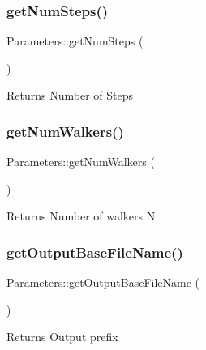 \subsubsection{\texorpdfstring{get\+Num\+Steps()}{getNumSteps()}}
{\footnotesize\ttfamily Parameters\+::get\+Num\+Steps (\begin{DoxyParamCaption}{ }\end{DoxyParamCaption})}

\begin{DoxyReturn}{Returns}
Number of Steps 
\end{DoxyReturn}
\mbox{\label{class_parameters_adb8599bc60f977f684f32a83bbe28fc1}} 
\subsubsection{\texorpdfstring{get\+Num\+Walkers()}{getNumWalkers()}}
{\footnotesize\ttfamily Parameters\+::get\+Num\+Walkers (\begin{DoxyParamCaption}{ }\end{DoxyParamCaption})}

\begin{DoxyReturn}{Returns}
Number of walkers N 
\end{DoxyReturn}
\mbox{\label{class_parameters_a794fd941bf5ff311f61f2e6b4f19e64d}} 
\subsubsection{\texorpdfstring{get\+Output\+Base\+File\+Name()}{getOutputBaseFileName()}}
{\footnotesize\ttfamily Parameters\+::get\+Output\+Base\+File\+Name (\begin{DoxyParamCaption}{ }\end{DoxyParamCaption})}

\begin{DoxyReturn}{Returns}
Output prefix 
\end{DoxyReturn}
\mbox{\label{class_parameters_a7291b970983c021569cd2e3a0573592c}} 
